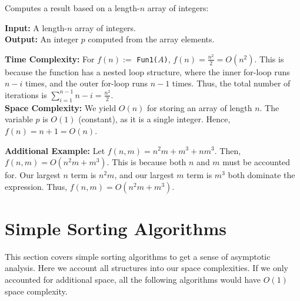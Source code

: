 \begin{Func}
    Computes a result based on a length-$n$ array of integers:

    \vspace{.5em}
    \noindent
    \textbf{Input: } A length-$n$ array of integers.\\
    \textbf{Output: } An integer $p$ computed from the array elements.\\
    \begin{algorithm}[H]
        \SetAlgoLined
        
        \vspace{.5em}
    \end{algorithm}

    \noindent
    \textbf{Time Complexity:} For $f(n):=$ \texttt{Fun1($A$)}, $f(n)=\frac{n^2}{2}=O(n^2)$. This is because the function has a nested loop structure, where the inner for-loop runs $n-i$ times, and the outer for-loop runs $n-1$ times. Thus, the total number of iterations is $\sum_{i=1}^{n-1}n-i=\frac{n^2}{2}$.\\

    \noindent
    \textbf{Space Complexity:} We yield $O(n)$ for storing an array of length $n$. The variable $p$ is $O(1)$ (constant), as it is a single integer. Hence, $f(n)=n+1=O(n)$.
    \end{Func}   

    \noindent
    \textbf{Additional Example:} Let $f(n,m) = n^2m + m^3 + nm^3$. Then, $f(n,m)=O(n^2m+m^3)$. This is because both $n$ and $m$ must be accounted for. Our largest $n$ term is $n^2m$, and our largest $m$ term is $m^3$ both dominate the expression. Thus, $f(n,m)=O(n^2m+m^3)$.

\newpage 

\section{Simple Sorting Algorithms}

\noindent
This section covers simple sorting algorithms to get a sense of asymptotic analysis.
Here we account all structures into our space complexities. If we only accounted for additional space,
all the following algorithms would have $O(1)$ space complexity.

